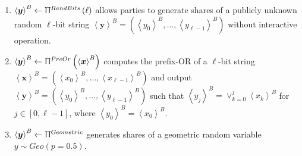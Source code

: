 \begin{enumerate}

      \item $\left\langle \boldsymbol{y}\right\rangle^B \gets \Uppi^{RandBits}\left(\ell\right) $ allows parties to generate shares of a publicly unknown random $\ell$-bit string $\left\langle \boldsymbol{y}\right\rangle^B =\left( \left\langle y_{0}\right\rangle^B ,\ldots ,\left\langle y_{\ell-1}\right\rangle ^B\right)$ without interactive operation.

      \item $\left\langle \boldsymbol{y}\right\rangle^B \gets \Uppi^{PreOr}\left(\left\langle \boldsymbol{x}\right\rangle ^B\right) $ computes the prefix-OR of a $\ell$-bit string $\left\langle \boldsymbol{x}\right\rangle^B= \left(\left\langle x_{0}\right\rangle ^B,\ldots, \left\langle x_{\ell-1}\right\rangle ^B\right) $ and output $\left\langle \boldsymbol{y}\right\rangle^B= \left(\left\langle y_{0}\right\rangle ^B,\ldots, \left\langle y_{\ell-1}\right\rangle ^B\right) $ such that $\left\langle y_{j}\right\rangle^B = \lor _{k=0}^{j} \left\langle x_{k} \right\rangle ^B$ for $j \in \left[0,\ell-1\right] $, where $\left\langle y_{0}\right\rangle^B =\left\langle x_{0} \right\rangle ^B$.

      \item $\left\langle \boldsymbol{y}\right\rangle^{B} \gets \Uppi^{Geometric} $ generates shares of a geometric random variable $y\sim Geo\left(p=0.5\right) $.


\end{enumerate}
